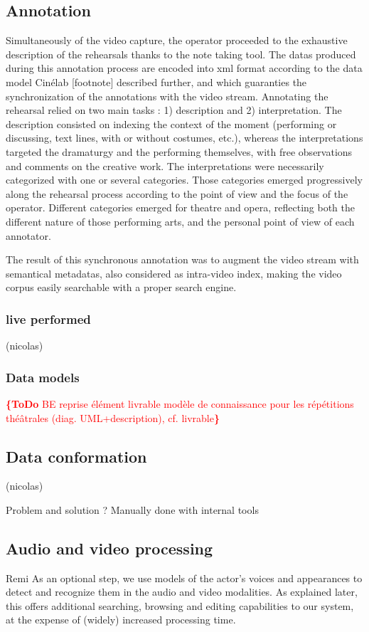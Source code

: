 \documentclass[conference]{IEEEtran}
\newcommand{\todo}[1]{\noindent\textcolor{red}{{\bf \{ToDo} #1{\bf \}}}}
\begin{document}
\subsection{Annotation}
Simultaneously of the video capture, the operator proceeded to the exhaustive description of the rehearsals thanks to the note taking tool. The datas produced during this annotation process are encoded into xml format according to the data model Cinélab [footnote] described further, and which guaranties the synchronization of the annotations with the video stream. 
Annotating the rehearsal relied on two main tasks : 1) description and 2) interpretation. The description consisted on indexing the context of the moment (performing or discussing, text lines, with or without costumes, etc.), whereas the interpretations targeted the dramaturgy and the performing themselves, with free observations and comments on the creative work. The interpretations were necessarily categorized with one or several categories. Those categories emerged progressively along the rehearsal process according to the point of view and the focus of the operator. 
Different categories emerged for theatre and opera, reflecting both the different nature of those performing arts, and the personal point of view of each annotator.

The result of this synchronous annotation was to augment the video stream with semantical metadatas, also considered as intra-video index, making the video corpus easily searchable with a proper search engine.
\subsubsection{live performed} (nicolas)

\subsubsection{Data models}
\todo{BE reprise élément livrable modèle de connaissance pour les répétitions théâtrales (diag. UML+description), cf. livrable}

\subsection{Data conformation} (nicolas)

Problem and solution ? Manually done with internal tools

\subsection{Audio and video processing} Remi
As an optional step, we use models of  the actor's voices and appearances to detect and recognize them
in the audio and video modalities. As explained later, this offers additional searching, browsing and editing capabilities
to our system, at the expense of (widely) increased processing time.
\end{document}

